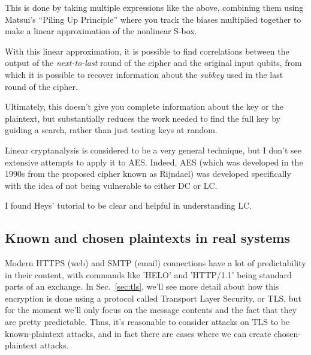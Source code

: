 This is done by taking multiple expressions like the above, combining
them using Matsui's ``Piling Up Principle'' where you track the biases
multiplied together to make a linear approximation of the nonlinear
S-box.

With this linear approximation, it is possible to find correlations
between the output of the \emph{next-to-last} round of the cipher and the
original input qubits, from which it is possible to recover
information about the \emph{subkey} used in the last round of the cipher.

Ultimately, this doesn't give you complete information about the key
or the plaintext, but substantially reduces the work needed to find
the full key by guiding a search, rather than just testing keys at
random.

\aono{}
Linear cryptanalysis is considered to be a very general technique, but
I don't see extensive attempts to apply it to AES.  Indeed, AES (which
was developed in the 1990s from the proposed cipher known as Rijndael)
was developed specifically with the idea of not being vulnerable to
either DC or LC.

I found Heys' tutorial to be clear and helpful in understanding LC.

\subsection{Known and chosen plaintexts in real systems}



Modern HTTPS (web) and SMTP (email) connections have a lot of
predictability in their content, with commands like 'HELO' and
'HTTP/1.1' being standard parts of an exchange.  In
Sec.~\ref{sec:tls}, we'll see more detail about how this encryption is
done using a protocol called Transport Layer Security, or TLS, but for
the moment we'll only focus on the message contents and the fact that
they are pretty predictable.  Thus, it's reasonable to consider
attacks on TLS to be known-plaintext attacks, and in fact there are
cases where we can create chosen-plaintext attacks.

